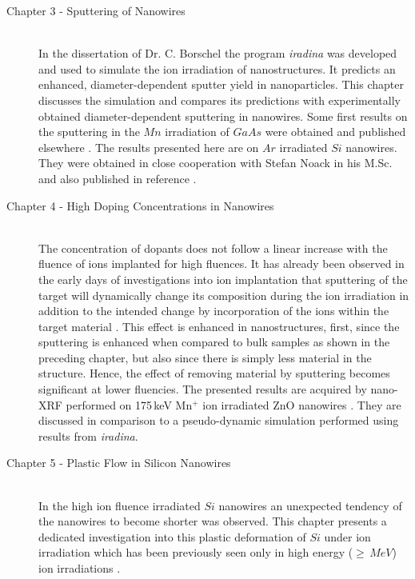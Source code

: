\begin{description}
  \item[\normalfont Chapter 3 - Sputtering of Nanowires] \hfill \\
  In the dissertation of Dr. C. Borschel \cite{borschel_ion-solid_2012} the program \emph{iradina} \cite{borschel_ion_2011} was developed and used to simulate the ion irradiation of nanostructures. It predicts an enhanced, diameter-dependent sputter yield in nanoparticles. This chapter discusses the simulation and compares its predictions with experimentally obtained diameter-dependent sputtering in nanowires. Some first results on the sputtering in the $Mn$ irradiation of $GaAs$ were obtained and published elsewhere \cite{johannes_enhanced_2014}. The results presented here are on $Ar$ irradiated $Si$ nanowires. They were obtained in close cooperation with Stefan Noack in his M.Sc. and also published in reference \cite{johannes_anomalous_2015}.
  \item[\normalfont Chapter 4 - High Doping Concentrations in Nanowires] \hfill \\
  The concentration of dopants does not follow a linear increase with the fluence of ions implanted for high fluences. It has already been observed in the early days of investigations into ion implantation that sputtering of the target will dynamically change its composition during the ion irradiation in addition to the intended change by incorporation of the ions within the target material \cite{moller_tridyn_1984,moller_tridyn-binary_1988,miyagawa_computer_1991,sigmund_alloy_1993,eckstein_oscillations_2000}. This effect is enhanced in nanostructures, first, since the sputtering is enhanced when compared to bulk samples as shown in the preceding chapter, but also since there is simply less material in the structure. Hence, the effect of removing material by sputtering becomes significant at lower fluencies. The presented results are acquired by nano-XRF performed on 175\,keV Mn$^+$ ion irradiated ZnO nanowires \cite{johannes_enhanced_2014}. They are discussed in comparison to a pseudo-dynamic simulation performed using results from \emph{iradina}.
  \item[\normalfont Chapter 5 - Plastic Flow in Silicon Nanowires] \hfill \\
  In the high ion fluence irradiated $Si$ nanowires an unexpected tendency of the nanowires to become shorter was observed. This chapter presents a dedicated investigation into this plastic deformation of $Si$ under ion irradiation which has been previously seen only in high energy ($\ge\,MeV$) ion irradiations \cite{volkert_stress_1991,trinkaus_viscoelastic_1995,hedler_amorphous_2004,hedler_boundary_2005}.
\end{description}
